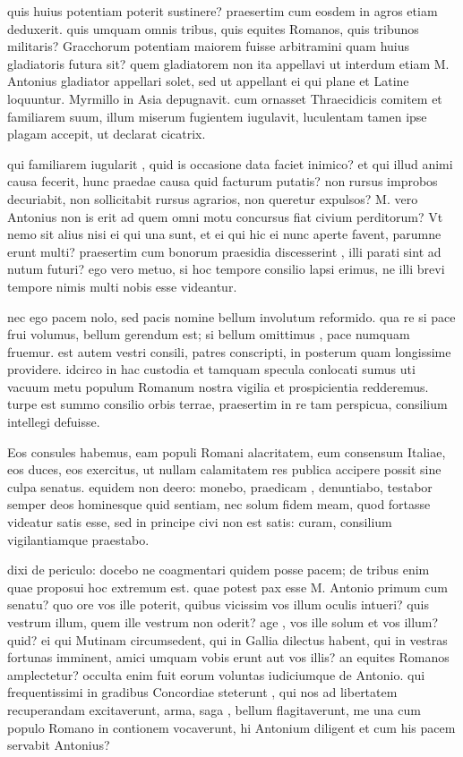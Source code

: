  quis huius potentiam poterit sustinere? praesertim cum eosdem in agros etiam deduxerit. quis umquam omnis tribus, quis equites Romanos, quis tribunos militaris? Gracchorum potentiam maiorem fuisse arbitramini quam huius gladiatoris futura sit? quem gladiatorem non ita appellavi ut interdum etiam M. Antonius gladiator appellari solet, sed ut appellant ei qui plane et Latine loquuntur. Myrmillo in Asia depugnavit. cum ornasset Thraecidicis comitem et familiarem suum, illum miserum fugientem iugulavit, luculentam tamen ipse plagam accepit, ut declarat cicatrix.

 qui familiarem iugularit , quid is occasione data faciet inimico? et qui illud animi causa fecerit, hunc praedae causa quid facturum putatis? non rursus improbos decuriabit, non sollicitabit rursus agrarios, non queretur expulsos? M. vero Antonius non is erit ad quem omni motu concursus fiat civium perditorum? Vt nemo sit alius nisi ei qui una sunt, et ei qui hic ei nunc aperte favent, parumne erunt multi? praesertim cum bonorum praesidia discesserint , illi parati sint ad nutum futuri? ego vero metuo, si hoc tempore consilio lapsi erimus, ne illi brevi tempore nimis multi nobis esse videantur.

 nec ego pacem nolo, sed pacis nomine bellum involutum reformido. qua re si pace frui volumus, bellum gerendum est; si bellum omittimus , pace numquam fruemur. est autem vestri consili, patres conscripti, in posterum quam longissime providere. idcirco in hac custodia et tamquam specula conlocati sumus uti vacuum metu populum Romanum nostra vigilia et prospicientia redderemus. turpe est summo consilio orbis terrae, praesertim in re tam perspicua, consilium intellegi defuisse.

 Eos consules habemus, eam populi Romani alacritatem, eum consensum Italiae, eos duces, eos exercitus, ut nullam calamitatem res publica accipere possit sine culpa senatus. equidem non deero: monebo, praedicam , denuntiabo, testabor semper deos hominesque quid sentiam, nec solum fidem meam, quod fortasse videatur satis esse, sed in principe civi non est satis: curam, consilium vigilantiamque praestabo.

 dixi de periculo: docebo ne coagmentari quidem posse pacem; de tribus enim quae proposui hoc extremum est. quae potest pax esse M. Antonio primum cum senatu? quo ore vos ille poterit, quibus vicissim vos illum oculis intueri? quis vestrum illum, quem ille vestrum non oderit? age , vos ille solum et vos illum? quid? ei qui Mutinam circumsedent, qui in Gallia dilectus habent, qui in vestras fortunas imminent, amici umquam vobis erunt aut vos illis? an equites Romanos amplectetur? occulta enim fuit eorum voluntas iudiciumque de Antonio. qui frequentissimi in gradibus Concordiae steterunt , qui nos ad libertatem recuperandam excitaverunt, arma, saga , bellum flagitaverunt, me una cum populo Romano in contionem vocaverunt, hi Antonium diligent et cum his pacem servabit Antonius?

